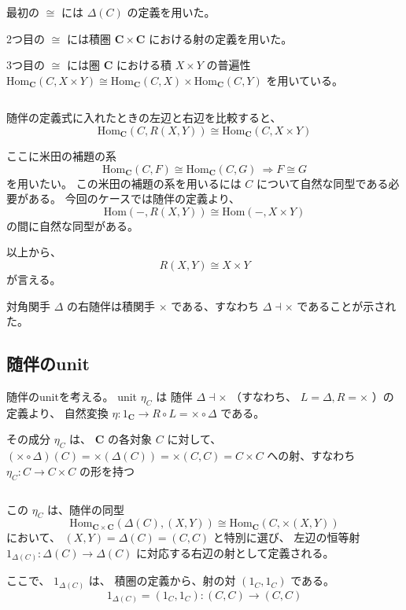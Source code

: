 \documentclass[uplatex,a4j,12pt,dvipdfmx]{jsarticle}
\begin{document}
最初の $\cong$ には $\Delta(C)$ の定義を用いた。

2つ目の $\cong$ には積圏 $\mathbf{C} \times \mathbf{C}$ における射の定義を用いた。

3つ目の $\cong$ には圏 $\mathbf{C}$ における積 $X \times Y$ の普遍性
$\mathrm{Hom}_{\mathbf{C}}(C, X \times Y) \cong \mathrm{Hom}_{\mathbf{C}}(C, X) \times \mathrm{Hom}_{\mathbf{C}}(C, Y)$
を用いている。

${}$

随伴の定義式に入れたときの左辺と右辺を比較すると、
$$
	\mathrm{Hom}_{\mathbf{C}}(C, R(X,Y))
	\cong
	\mathrm{Hom}_{\mathbf{C}}(C, X \times Y)
$$

ここに米田の補題の系
$$
	\mathrm{Hom}_{\mathbf{C}}(C, F)
	\cong
	\mathrm{Hom}_{\mathbf{C}}(C, G)
	\ \Rightarrow
	F \cong G
$$
を用いたい。
この米田の補題の系を用いるには $C$ について自然な同型である必要がある。
今回のケースでは随伴の定義より、
$$
	\mathrm{Hom}(-, R(X,Y))
	\cong
	\mathrm{Hom}(-, X \times Y)
$$
の間に自然な同型がある。

以上から、
$$
	R(X,Y)
	\cong
	X \times Y
$$
が言える。

対角関手 $\Delta$ の右随伴は積関手 $\times$ である、すなわち $\Delta \dashv \times$ であることが示された。

\subsection{随伴のunit}

随伴のunitを考える。
unit $\eta_{C} $ は
随伴 $\Delta \dashv \times$ （すなわち、 $L=\Delta, R= \times$ ）の定義より、
自然変換
$\eta : 1_{\mathbf{C}} \to R \circ L = \times \circ \Delta$
である。

その成分 $\eta_{C}$ は、 $\mathbf{C}$ の各対象 $C$ に対して、
$(\times \circ \Delta)(C) = \times (\Delta (C)) = \times (C,C) = C \times C$
への射、すなわち
$\eta_{C} : C \to C \times C$ の形を持つ

${}$

この $\eta_{C}$ は、随伴の同型
$$
	\mathrm{Hom}_{\mathbf{C} \times \mathbf{C}}(\Delta(C), (X,Y)) \cong \mathrm{Hom}_{\mathbf{C}}(C,  \times (X,Y))
$$
において、
$(X,Y) = \Delta (C) = (C,C)$ と特別に選び、
左辺の恒等射
$1_{\Delta(C)} : \Delta(C) \to \Delta(C)$
に対応する右辺の射として定義される。

ここで、
$1_{\Delta(C)}$
は、
積圏の定義から、射の対
$(1_{C}, 1_{C})$
である。
$$
	1_{\Delta(C)} = (1_{C}, 1_{C}) : (C,C) \to (C,C)
$$

${}$
\end{document}
